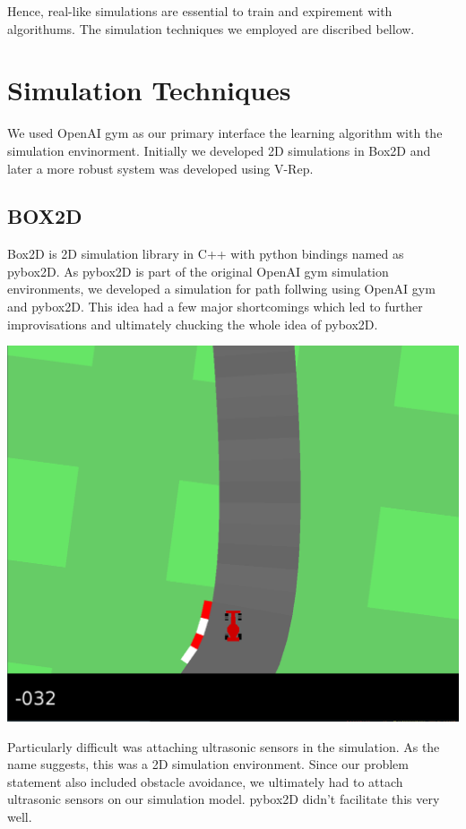 \documentclass[12pt]{extreport}
\theoremstyle{plain}
\theoremstyle{definition}
\begin{document}
Hence, real-like simulations are essential to train and expirement with
algorithums. The simulation techniques we employed are discribed bellow.

\section{Simulation Techniques}
We used OpenAI gym as our primary interface the learning algorithm with the simulation envinorment. Initially we developed 2D simulations in Box2D and later a more robust system was developed using V-Rep.

\subsection{BOX2D}
Box2D is 2D simulation library in C++ with python bindings named as pybox2D. As pybox2D is part of the original OpenAI gym simulation environments, we developed a simulation for path follwing using OpenAI gym and pybox2D. This idea had a few major shortcomings which led to further improvisations and ultimately chucking the whole idea of pybox2D.

\begin{center}
    \includegraphics[width=0.8\linewidth]{1.png}
\end{center}

Particularly difficult was attaching ultrasonic sensors in the simulation. As the name suggests, this was a 2D simulation environment. Since our problem statement also included obstacle avoidance, we ultimately had to attach ultrasonic sensors on our simulation model. pybox2D didn't facilitate this very well.
\end{document}
